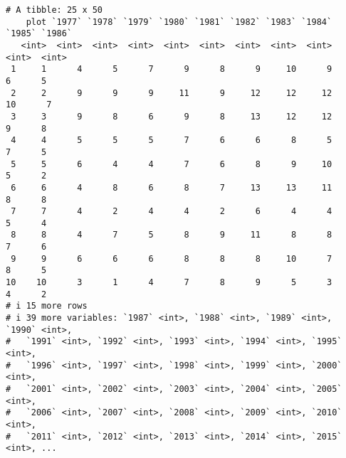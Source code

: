 \documentclass[
  letterpaper,
  DIV=11,
  numbers=noendperiod]{scrartcl}
\begin{document}
\begin{verbatim}
# A tibble: 25 x 50
    plot `1977` `1978` `1979` `1980` `1981` `1982` `1983` `1984` `1985` `1986`
   <int>  <int>  <int>  <int>  <int>  <int>  <int>  <int>  <int>  <int>  <int>
 1     1      4      5      7      9      8      9     10      9      6      5
 2     2      9      9      9     11      9     12     12     12     10      7
 3     3      9      8      6      9      8     13     12     12      9      8
 4     4      5      5      5      7      6      6      8      5      7      5
 5     5      6      4      4      7      6      8      9     10      5      2
 6     6      4      8      6      8      7     13     13     11      8      8
 7     7      4      2      4      4      2      6      4      4      5      4
 8     8      4      7      5      8      9     11      8      8      7      6
 9     9      6      6      6      8      8      8     10      7      8      5
10    10      3      1      4      7      8      9      5      3      4      2
# i 15 more rows
# i 39 more variables: `1987` <int>, `1988` <int>, `1989` <int>, `1990` <int>,
#   `1991` <int>, `1992` <int>, `1993` <int>, `1994` <int>, `1995` <int>,
#   `1996` <int>, `1997` <int>, `1998` <int>, `1999` <int>, `2000` <int>,
#   `2001` <int>, `2002` <int>, `2003` <int>, `2004` <int>, `2005` <int>,
#   `2006` <int>, `2007` <int>, `2008` <int>, `2009` <int>, `2010` <int>,
#   `2011` <int>, `2012` <int>, `2013` <int>, `2014` <int>, `2015` <int>, ...
\end{verbatim}
\end{document}

